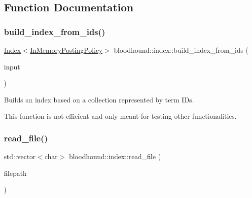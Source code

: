 \subsection{Function Documentation}
\mbox{\label{namespacebloodhound_1_1index_ac508959a4f3ab5ce65d62f1c294359e2}} 
\subsubsection{\texorpdfstring{build\+\_\+index\+\_\+from\+\_\+ids()}{build\_index\_from\_ids()}}
{\footnotesize\ttfamily \hyperlink{classbloodhound_1_1index_1_1Index}{Index}$<$\hyperlink{classbloodhound_1_1index_1_1InMemoryPostingPolicy}{In\+Memory\+Posting\+Policy}$>$ bloodhound\+::index\+::build\+\_\+index\+\_\+from\+\_\+ids (\begin{DoxyParamCaption}\item[{const std\+::vector$<$ std\+::vector$<$ \hyperlink{structbloodhound_1_1TermWeight}{Term\+Weight} $>$$>$ \&}]{input }\end{DoxyParamCaption})}

Builds an index based on a collection represented by term I\+Ds.

This function is not efficient and only meant for testing other functionalities. \mbox{\label{namespacebloodhound_1_1index_a4b6f89a17c10bf2927aff24df7081bb3}} 
\subsubsection{\texorpdfstring{read\+\_\+file()}{read\_file()}}
{\footnotesize\ttfamily std\+::vector$<$char$>$ bloodhound\+::index\+::read\+\_\+file (\begin{DoxyParamCaption}\item[{fs\+::path}]{filepath }\end{DoxyParamCaption})}

\mbox{\label{namespacebloodhound_1_1index_a306f62c55e8d06a9703f552f7cf312c5}} 

